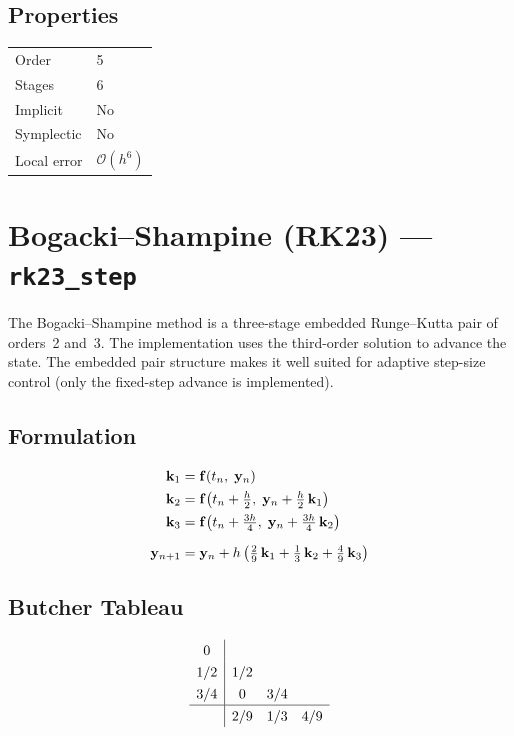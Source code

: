 \documentclass[11pt,a4paper]{article}
\newcommand{\bk}{\mathbf{k}}
\newcommand{\by}{\mathbf{y}}
\newcommand{\bff}{\mathbf{f}}
\newcommand{\bigO}{\mathcal{O}}
\begin{document}
\subsection{Properties}
\begin{center}
\begin{tabular}{ll}
  \hline
  Order          & 5 \\
  Stages         & 6 \\
  Implicit       & No \\
  Symplectic     & No \\
  Local error    & $\bigO(h^6)$ \\
  \hline
\end{tabular}
\end{center}

\section{Bogacki--Shampine (RK23) --- \texttt{rk23\_step}}
\label{sec:rk23}

The Bogacki--Shampine method is a three-stage embedded Runge--Kutta pair of
orders~2 and~3. The implementation uses the third-order solution to advance
the state. The embedded pair structure makes it well suited for adaptive
step-size control (only the fixed-step advance is implemented).

\subsection{Formulation}
\begin{align}
  \bk_1 &= \bff(t_n,\;\by_n) \notag\\
  \bk_2 &= \bff\!\left(t_n + \tfrac{h}{2},\;\by_n + \tfrac{h}{2}\,\bk_1\right) \notag\\
  \bk_3 &= \bff\!\left(t_n + \tfrac{3h}{4},\;\by_n + \tfrac{3h}{4}\,\bk_2\right) \notag\\[6pt]
  \by_{n+1} &= \by_n + h\left(\tfrac{2}{9}\,\bk_1 + \tfrac{1}{3}\,\bk_2
               + \tfrac{4}{9}\,\bk_3\right)
  \label{eq:rk23}
\end{align}

\subsection{Butcher Tableau}
\[
\renewcommand{\arraystretch}{1.3}
\begin{array}{c|ccc}
  0    &      &      &     \\
  1/2  & 1/2  &      &     \\
  3/4  & 0    & 3/4  &     \\
  \hline
       & 2/9  & 1/3  & 4/9 \\
\end{array}
\]
\end{document}
